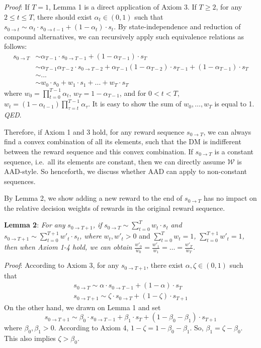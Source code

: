 \documentclass[
  12pt,
]{article}
\begin{document}
\noindent \emph{Proof}: If \(T=1\), Lemma 1 is a direct application of
Axiom 3. If \(T\geq 2\), for any \(2\leq t\leq T\), there should exist
\(\alpha_t\in(0,1)\) such that
\(s_{0\rightarrow t}\sim \alpha_t\cdot s_{0\rightarrow t-1}+(1-\alpha_t)\cdot s_{t}\).
By state-independence and reduction of compound alternatives, we can
recursively apply such equivalence relations as follows:\[
\begin{aligned}
s_{0\rightarrow T} &\sim \alpha_{T-1}\cdot s_{0\rightarrow T-1} + (1-\alpha_{T-1})\cdot s_T \\
&\sim  \alpha_{T-1}\alpha_{T-2}\cdot s_{0\rightarrow T-2} + \alpha_{T-1}(1-\alpha_{T-2})\cdot s_{T-1} + (1-\alpha_{T-1})\cdot s_T \\
& \sim ...\\
& \sim w_0 \cdot s_0 + w_1\cdot s_1 +... +w_T\cdot s_T
\end{aligned}
\]where \(w_0=\prod_{t=0}^{T-1}\alpha_t\), \(w_T = 1-\alpha_{T-1}\), and
for \(0<t<T\),
\(w_t=(1-\alpha_{t-1})\prod_{\tau=t}^{T-1}\alpha_{\tau}\). It is easy to
show the sum of \(w_0,…,w_T\) is equal to 1. \emph{QED}.

Therefore, if Axiom 1 and 3 hold, for any reward sequence
\(s_{0\rightarrow T}\), we can always find a convex combination of all
its elements, such that the DM is indifferent between the reward
sequence and this convex combination. If \(s_{0\rightarrow T}\) is a
constant sequence, i.e.~all its elements are constant, then we can
directly assume \(\mathcal{W}\) is AAD-style. So henceforth, we discuss
whether AAD can apply to non-constant sequences.

By Lemma 2, we show adding a new reward to the end of
\(s_{0\rightarrow T}\) has no impact on the relative decision weights of
rewards in the original reward sequence.

\noindent \textbf{Lemma 2}: \emph{For any}
\(s_{0\rightarrow T+1}\)\emph{, if}
\(s_{0\rightarrow T}\sim \sum_{t=0}^T w_t \cdot s_t\) \emph{and}
\(s_{0\rightarrow T+1} \sim \sum_{t=0}^{T+1} w'_t\cdot s_t\)\emph{,
where} \(w_t, w'_t>0\) and \(\sum_{t=0}^Tw_t=1\)\emph{,}
\(\sum_{t=0}^{T+1}w'_t=1\)\emph{, then when Axiom 1-4 hold, we can
obtain} \(\frac{w'_0}{w_0}=\frac{w'_1}{w_1}=…=\frac{w'_T}{w_T}\)\emph{.}

\noindent \emph{Proof}: According to Axiom 3, for any
\(s_{0\rightarrow T+1}\), there exist \(\alpha,\zeta \in (0,1)\) such
that\[\tag{A1}
\begin{aligned}
s_{0 \rightarrow T}\sim\alpha\cdot s_{0 \rightarrow T-1} + (1-\alpha)\cdot s_T \\
s_{0\rightarrow T+1} \sim \zeta\cdot s_{0\rightarrow T} + (1-\zeta)\cdot s_{T+1}
\end{aligned}
\]On the other hand, we drawn on Lemma 1 and set\[\tag{A2}
s_{0\rightarrow T+1} \sim \beta_0\cdot s_{0 \rightarrow T-1} + \beta_1\cdot s_T + (1-\beta_0-\beta_1)\cdot s_{T+1}
\]where \(\beta_0, \beta_1 > 0\). According to Axiom 4,
\(1-\zeta=1-\beta_0-\beta_1\). So, \(\beta_1=\zeta-\beta_0\). This also
implies \(\zeta > \beta_0\).
\end{document}
